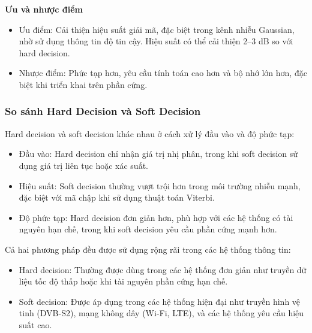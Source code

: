 \textbf{Ưu và nhược điểm}

\begin{itemize}[label=-]
	\item Ưu điểm: Cải thiện hiệu suất giải mã, đặc biệt trong kênh nhiễu Gaussian, nhờ sử dụng thông tin độ tin cậy. Hiệu suất có thể cải thiện 2–3 dB so với hard decision.
	\item Nhược điểm: Phức tạp hơn, yêu cầu tính toán cao hơn và bộ nhớ lớn hơn, đặc biệt khi triển khai trên phần cứng.
\end{itemize}

\subsubsection{So sánh Hard Decision và Soft Decision}

Hard decision và soft decision khác nhau ở cách xử lý đầu vào và độ phức tạp:
\begin{itemize}[label=-]
	\item Đầu vào: Hard decision chỉ nhận giá trị nhị phân, trong khi soft decision sử dụng giá trị liên tục hoặc xác suất.
	\item Hiệu suất: Soft decision thường vượt trội hơn trong môi trường nhiễu mạnh, đặc biệt với mã chập khi sử dụng thuật toán Viterbi.
	\item Độ phức tạp: Hard decision đơn giản hơn, phù hợp với các hệ thống có tài nguyên hạn chế, trong khi soft decision yêu cầu phần cứng mạnh hơn.
\end{itemize}

Cả hai phương pháp đều được sử dụng rộng rãi trong các hệ thống thông tin:
\begin{itemize}[label=-]
	\item Hard decision: Thường được dùng trong các hệ thống đơn giản như truyền dữ liệu tốc độ thấp hoặc khi tài nguyên phần cứng hạn chế.
	\item Soft decision: Được áp dụng trong các hệ thống hiện đại như truyền hình vệ tinh (DVB-S2), mạng không dây (Wi-Fi, LTE), và các hệ thống yêu cầu hiệu suất cao.
\end{itemize}